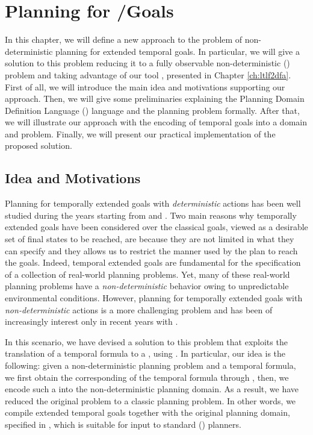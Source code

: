 \chapter{Planning for \LTLf/\PLTL Goals}\label{ch:planning}
In this chapter, we will define a new approach to the problem of non-deterministic planning for extended temporal goals. In particular, we will give a solution to this problem reducing it to a fully observable non-deterministic (\FOND) problem and taking advantage of our tool \LTLfToDFA, presented in Chapter \ref{ch:ltlf2dfa}. First of all, we will introduce the main idea and motivations supporting our approach. Then, we will give some preliminaries explaining the Planning Domain Definition Language (\PDDL) language and the \FOND planning problem formally. After that, we will illustrate our \FONDFOR approach with the encoding of temporal goals into a \PDDL domain and problem. Finally, we will present our practical implementation of the proposed solution.
\section{Idea and Motivations}\label{sec:plan-idea-motiv}
Planning for temporally extended goals with \textit{deterministic} actions has been well studied during the years starting from \citep{bacchus1998planning} and \citep{doherty2001talplanner}. Two main reasons why temporally extended goals have been considered over the classical goals, viewed as a desirable set of final states to be reached, are because they are not limited in what they can specify and they allows us to restrict the manner used by the plan to reach the goals. Indeed, temporal extended goals are fundamental for the specification of a collection of real-world planning problems. Yet, many of these real-world planning problems have a \textit{non-deterministic} behavior owing to unpredictable environmental conditions. However, planning for temporally extended goals with \textit{non-deterministic} actions is a more challenging problem and has been of increasingly interest only in recent years with \citep{camacho2017non, de2018automata}.

In this scenario, we have devised a solution to this problem that exploits the translation of a temporal formula to a \DFA, using \LTLfToDFA. In particular, our idea is the following: given a non-deterministic planning problem and a temporal formula, we first obtain the corresponding \DFA of the temporal formula through \LTLfToDFA, then, we encode such a \DFA into the non-deterministic planning domain. As a result, we have reduced the original problem to a classic \FOND planning problem. In other words, we compile extended temporal goals together with the original planning domain, specified in \PDDL, which is suitable for input to standard (\FOND) planners.
